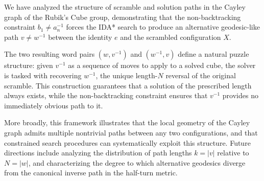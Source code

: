 \documentclass{article}
\begin{document}
We have analyzed the structure of scramble and solution paths in the Cayley graph of the
Rubik's Cube group, demonstrating that the non-backtracking constraint $b_1 \neq a_n^{-1}$
forces the IDA* search to produce an alternative geodesic-like path $v \neq w^{-1}$
between the identity $e$ and the scrambled configuration $X$.

The two resulting word pairs $(w, v^{-1})$ and $(w^{-1}, v)$ define a natural puzzle
structure: given $v^{-1}$ as a sequence of moves to apply to a solved cube, the solver
is tasked with recovering $w^{-1}$, the unique length-$N$ reversal of the original
scramble. This construction guarantees that a solution of the prescribed length always
exists, while the non-backtracking constraint ensures that $v^{-1}$ provides no
immediately obvious path to it.

More broadly, this framework illustrates that the local geometry of the Cayley graph
admits multiple nontrivial paths between any two configurations, and that constrained
search procedures can systematically exploit this structure. Future directions include
analyzing the distribution of path lengths $k = |v|$ relative to $N = |w|$, and
characterizing the degree to which alternative geodesics diverge from the canonical
inverse path in the half-turn metric.
\end{document}
